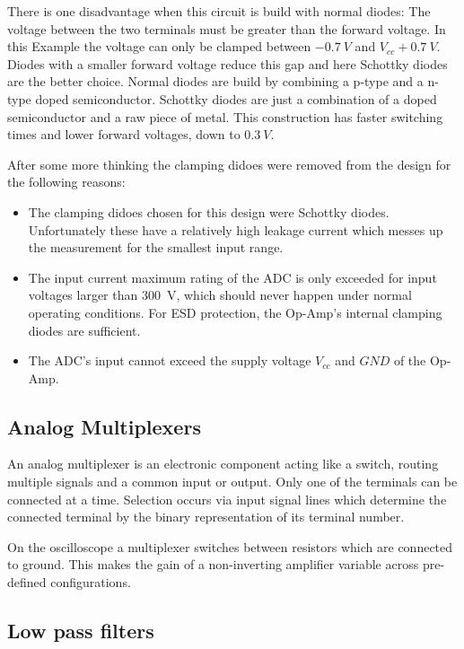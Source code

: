 There is one disadvantage when this circuit is build with normal diodes: The voltage between the two terminals must be greater than the forward voltage. In this Example the voltage can only be clamped between $\SI{-0,7}{V}$ and $V_{cc} + \SI{0,7}{V}$. Diodes with a smaller forward voltage reduce this gap and here Schottky diodes are the better choice. Normal diodes are build by combining a p-type and a n-type doped semiconductor. Schottky diodes are just a combination of a doped semiconductor and a raw piece of metal. This construction has faster switching times and lower forward voltages, down to $\SI{0,3}{V}$.

After some more thinking the clamping didoes were removed from the design for the following reasons:
\begin{itemize}
	\item The clamping didoes chosen for this design were Schottky diodes. Unfortunately these have a relatively high leakage current which messes up the measurement for the smallest input range.
	\item The input current maximum rating of the ADC is only exceeded for input voltages larger than \SI{300}{V}, which should never happen under normal operating conditions. For ESD protection, the Op-Amp's internal clamping diodes are sufficient.
	\item The ADC's input cannot exceed the supply voltage $V_{cc}$ and $GND$ of the Op-Amp.
\end{itemize}

\subsection{Analog Multiplexers}

An analog multiplexer is an electronic component acting like a switch, routing multiple signals and a common input or output. Only one of the terminals can be connected at a time. Selection occurs via input signal lines which determine the connected terminal by the binary representation of its terminal number.

On the oscilloscope a multiplexer switches between resistors which are connected to ground. This makes the gain of a non-inverting amplifier variable across pre-defined configurations.

\subsection{Low pass filters}

